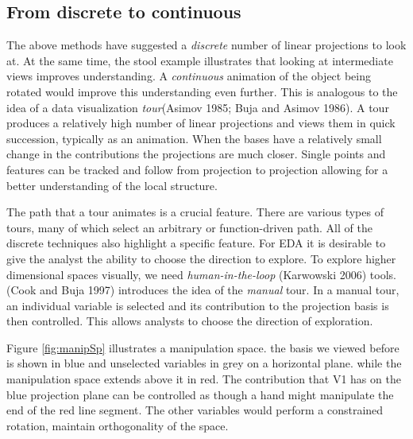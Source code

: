 \documentclass[
  11,
]{article}
\begin{document}
\hypertarget{from-discrete-to-continuous}{%
\subsection{From discrete to continuous}\label{from-discrete-to-continuous}}

The above methods have suggested a \emph{discrete} number of linear projections to look at. At the same time, the stool example illustrates that looking at intermediate views improves understanding. A \emph{continuous} animation of the object being rotated would improve this understanding even further. This is analogous to the idea of a data visualization \emph{tour}(Asimov 1985; Buja and Asimov 1986). A tour produces a relatively high number of linear projections and views them in quick succession, typically as an animation. When the bases have a relatively small change in the contributions the projections are much closer. Single points and features can be tracked and follow from projection to projection allowing for a better understanding of the local structure.

The path that a tour animates is a crucial feature. There are various types of tours, many of which select an arbitrary or function-driven path. All of the discrete techniques also highlight a specific feature. For EDA it is desirable to give the analyst the ability to choose the direction to explore. To explore higher dimensional spaces visually, we need \emph{human-in-the-loop} (Karwowski 2006) tools. (Cook and Buja 1997) introduces the idea of the \emph{manual} tour. In a manual tour, an individual variable is selected and its contribution to the projection basis is then controlled. This allows analysts to choose the direction of exploration.

Figure \ref{fig:manipSp} illustrates a manipulation space. the basis we viewed before is shown in blue and unselected variables in grey on a horizontal plane. while the manipulation space extends above it in red. The contribution that V1 has on the blue projection plane can be controlled as though a hand might manipulate the end of the red line segment. The other variables would perform a constrained rotation, maintain orthogonality of the space.
\end{document}
